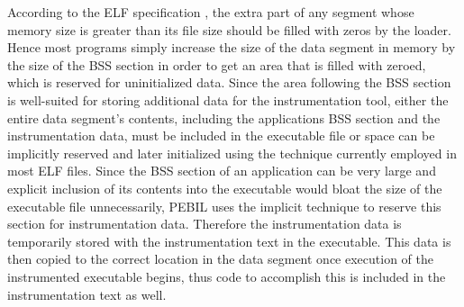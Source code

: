 According to the ELF specification \cite{standard1995executable}, the extra part of any
segment whose memory size is greater than its file size should be filled with
zeros by the loader. Hence most programs simply increase the size of the data
segment in memory by the size of the BSS section in order to get an
area that is filled with zeroed, which is reserved for uninitialized data. Since the area following the BSS section is well-suited for
storing additional data for the instrumentation tool, either the entire data
segment's contents, including the applications BSS section and the instrumentation data,
must be included in the executable file or space can be implicitly reserved and later initialized using the
technique currently employed in most ELF files.
Since the BSS section of an application can be very large and explicit inclusion of its contents
into the executable would bloat the size of the executable file unnecessarily, PEBIL uses the implicit
technique to reserve this section for instrumentation data. Therefore the instrumentation data is
temporarily stored with the instrumentation text in the
executable. This data is then copied to the correct location in the data segment once execution
of the instrumented executable begins, thus code to accomplish this is included in the
instrumentation text as well.
